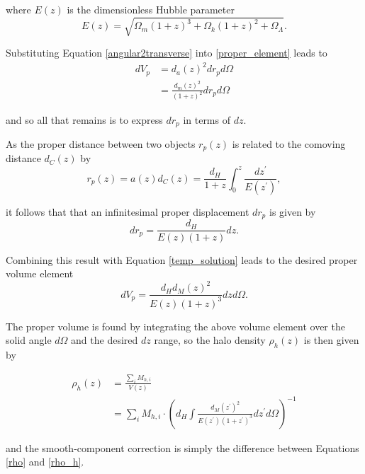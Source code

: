\documentclass[%
 reprint,
 amsmath,amssymb,
 aps,nofootinbib
]{revtex4-1}
\begin{document}
\noindent where $E(z)$ is the dimensionless Hubble parameter
\begin{equation}\label{dim_hubble_parameter}
E(z)=\sqrt{\Omega_m(1+z)^3+\Omega_k(1+z)^2+\Omega_\Lambda}.
\end{equation}

\noindent Substituting Equation \eqref{angular2transverse} into \eqref{proper_element} leads to
\begin{align}\label{temp_solution}
dV_p&=d_a(z)^2dr_pd\Omega\nonumber\\
&=\frac{d_m(z)^2}{(1+z)^2}dr_pd\Omega
\end{align}

\noindent and so all that remains is to express $dr_p$ in terms of $dz$.

As the proper distance between two objects $r_p(z)$ is related to the comoving distance $d_C(z)$ by
\begin{equation}\label{physical2comoving}
r_p(z)=a(z)d_C(z)=\frac{d_H}{1+z}\int_0^z\frac{dz^\prime}{E(z^\prime)},
\end{equation}

\noindent it follows that that an infinitesimal proper displacement $dr_p$ is given by
\begin{equation}\label{physical2comoving_inf}
dr_p=\frac{d_H}{E(z)(1+z)}dz.
\end{equation}

\noindent Combining this result with Equation \eqref{temp_solution} leads to the desired proper volume element
\begin{equation}\label{pvolume_element}
dV_p=\frac{d_Hd_M(z)^2}{E(z)(1+z)^3}dzd\Omega.
\end{equation}

The proper volume is found by integrating the above volume element over the solid angle $d\Omega$ and the desired $dz$ range, so the halo density $\rho_h(z)$ is then given by

\begin{align}\label{rho_h}
\rho_h(z)&=\frac{\sum_i M_{h,i}}{V(z)}\nonumber\\
&=\sum_i M_{h,i}\cdot\left(d_H\int\frac{d_M(z^\prime)^2}{E(z^\prime)(1+z^\prime)^3}dz^\prime d\Omega\right)^{-1}
\end{align}

\noindent and the smooth-component correction is simply the difference between Equations \eqref{rho} and \eqref{rho_h}.

\end{document}
